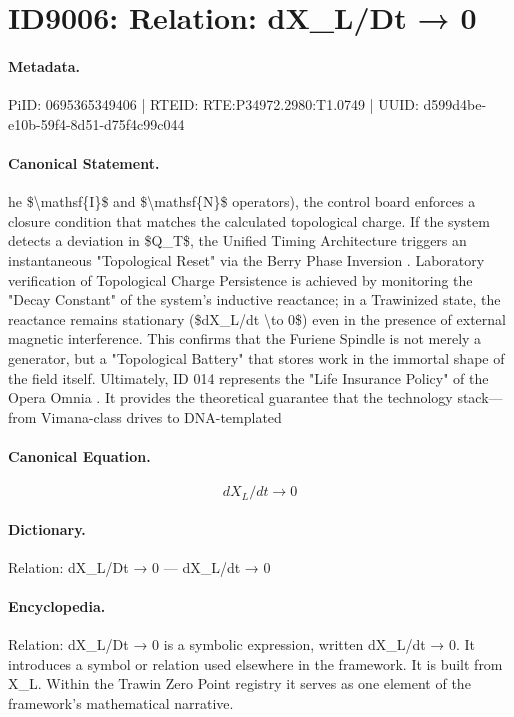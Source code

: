 \section*{ID9006: Relation: dX\_L/Dt → 0}
\paragraph{Metadata.}
PiID: 0695365349406 | RTEID: RTE:P34972.2980:T1.0749 | UUID: d599d4be-e10b-59f4-8d51-d75f4c99c044

\paragraph{Canonical Statement.}
he \$\textbackslash{}mathsf\{I\}\$ and \$\textbackslash{}mathsf\{N\}\$ operators), the control board enforces a closure condition that matches the calculated topological charge. If the system detects a deviation in \$Q\_T\$, the Unified Timing Architecture triggers an instantaneous "Topological Reset" via the Berry Phase Inversion . Laboratory verification of Topological Charge Persistence is achieved by monitoring the "Decay Constant" of the system's inductive reactance; in a Trawinized state, the reactance remains stationary (\$dX\_L/dt \textbackslash{}to 0\$) even in the presence of external magnetic interference. This confirms that the Furiene Spindle is not merely a generator, but a "Topological Battery" that stores work in the immortal shape of the field itself. Ultimately, ID 014 represents the "Life Insurance Policy" of the Opera Omnia . It provides the theoretical guarantee that the technology stack—from Vimana-class drives to DNA-templated

\paragraph{Canonical Equation.}
\[
dX_L/dt \to 0
\]

\paragraph{Dictionary.}
Relation: dX\_L/Dt → 0 — dX\_L/dt → 0

\paragraph{Encyclopedia.}
Relation: dX\_L/Dt → 0 is a symbolic expression, written dX\_L/dt → 0. It introduces a symbol or relation used elsewhere in the framework. It is built from X\_L. Within the Trawin Zero Point registry it serves as one element of the framework's mathematical narrative.
